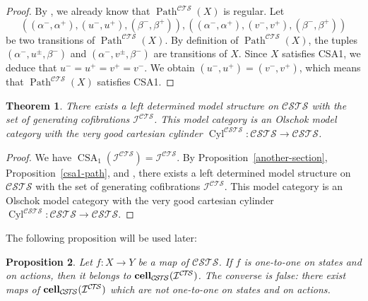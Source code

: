 \documentclass[a4paper,12pt]{amsart}
\newtheorem{thm}{Theorem}[section]
\newtheorem{prop}[thm]{Proposition}
\begin{document}
\begin{proof} By \cite[Proposition~3.10]{biscsts1}, we already know that
$\operatorname{{Path}}^{\mathcal{C\!T\!S}}(X)$ is regular. Let \[
((\alpha^-,\alpha^+),(u^-,u^+),(\beta^-,\beta^+)),((\alpha^-,\alpha^+),(v^-,v^+),(\beta^-,\beta^+))\]
be two transitions of $\operatorname{{Path}}^{\mathcal{C\!T\!S}}(X)$. By definition of
$\operatorname{{Path}}^{\mathcal{C\!T\!S}}(X)$, the tuples $ (\alpha^-,u^\pm,\beta^-)$ and
$(\alpha^-,v^\pm,\beta^-)$ are transitions of $X$. Since $X$ satisfies
CSA1, we deduce that $u^-=u^+=v^+=v^-$. We obtain
$(u^-,u^+)=(v^-,v^+)$, which means that $\operatorname{{Path}}^{\mathcal{C\!T\!S}}(X)$ satisfies
CSA1.  \end{proof}

\begin{thm} There exists a left determined model structure on ${\mathcal{C\!S\!T\!S}}$ with
the set of generating cofibrations ${\mathcal{I}}^{\mathcal{C\!T\!S}}$. This model category is
an Olschok model category with the very good cartesian cylinder
$\operatorname{{Cyl}}^{\mathcal{C\!S\!T\!S}}:{\mathcal{C\!S\!T\!S}} \to {\mathcal{C\!S\!T\!S}}$.  \end{thm}

\begin{proof} We have $\operatorname{CSA}_1({\mathcal{I}}^{\mathcal{C\!T\!S}})={\mathcal{I}}^{\mathcal{C\!T\!S}}$. By
Proposition~\ref{another-section}, Proposition~\ref{csa1-path},
\cite[Theorem~3.16]{biscsts1} and \cite[Theorem~3.1]{leftdet}, there
exists a left determined model structure on ${\mathcal{C\!S\!T\!S}}$ with the set of
generating cofibrations ${\mathcal{I}}^{\mathcal{C\!T\!S}}$. This model category is an Olschok
model category with the very good cartesian cylinder $\operatorname{{Cyl}}^{\mathcal{C\!S\!T\!S}}:{\mathcal{C\!S\!T\!S}}
\to {\mathcal{C\!S\!T\!S}}$.  \end{proof}

The following proposition will be used later: 

\begin{prop} \label{121-cof} Let $f:X\to Y$ be a map of ${\mathcal{C\!S\!T\!S}}$. If $f$ is
one-to-one on states and on actions, then it belongs to
$\operatorname{{{\rm{\mathbf{{cell}}}}}}_{\mathcal{C\!S\!T\!S}}({\mathcal{I}}^{\mathcal{C\!T\!S}})$. The converse is false: there exist maps of
$\operatorname{{{\rm{\mathbf{{cell}}}}}}_{\mathcal{C\!S\!T\!S}}({\mathcal{I}}^{\mathcal{C\!T\!S}})$ which are not one-to-one on states and on
actions.  \end{prop}
\end{document}
